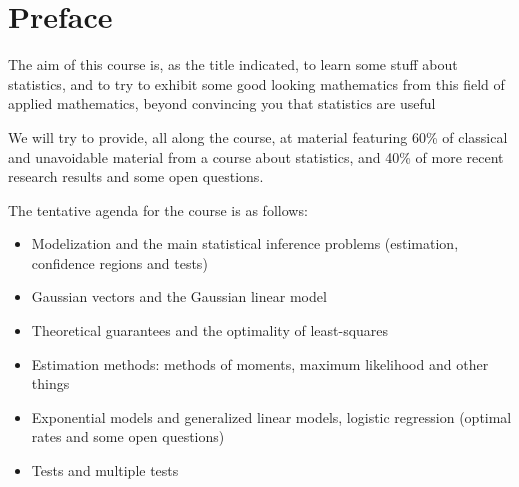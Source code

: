 \documentclass[
	fontsize=11pt, %
	twoside=false, %
	numbers=noenddot, %
]{kaobook}
\begin{document}
\chapter*{Preface}


The aim of this course is, as the title indicated, to learn some stuff about statistics, and to try to exhibit some good looking mathematics from this field of applied mathematics, beyond convincing you that statistics are useful

We will try to provide, all along the course, at material featuring 60\% of classical and unavoidable material from a course about statistics, and 40\% of more recent research results and some open questions.

The tentative agenda for the course is as follows:

\begin{itemize}
 	\item Modelization and the main statistical inference problems (estimation, confidence regions and tests)
 	\item Gaussian vectors and the Gaussian linear model
 	\item Theoretical guarantees and the optimality of least-squares
 	\item Estimation methods: methods of moments, maximum likelihood and other things
 	\item Exponential models and generalized linear models, logistic regression (optimal rates and some open questions)
 	\item Tests and multiple tests
 \end{itemize} 


\end{document}

